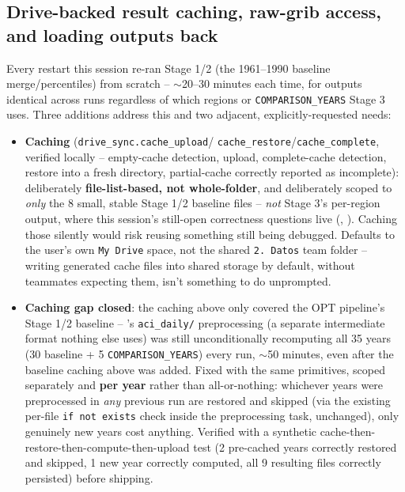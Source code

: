 \documentclass[11pt]{article}
\begin{document}
\subsection{Drive-backed result caching, raw-grib access, and loading
outputs back}

Every restart this session re-ran Stage 1/2 (the 1961--1990 baseline
merge/percentiles) from scratch -- $\sim$20--30 minutes each time, for
outputs identical across runs regardless of which regions or
\texttt{COMPARISON\_YEARS} Stage 3 uses. Three additions address this and
two adjacent, explicitly-requested needs:

\begin{itemize}[leftmargin=*]
\item \textbf{Caching} (\texttt{drive\_sync.cache\_upload}/
  \texttt{cache\_restore}/\texttt{cache\_complete}, verified locally --
  empty-cache detection, upload, complete-cache detection, restore into a
  fresh directory, partial-cache correctly reported as incomplete):
  deliberately \textbf{file-list-based, not whole-folder}, and
  deliberately scoped to \emph{only} the 8 small, stable Stage 1/2
  baseline files -- \emph{not} Stage 3's per-region output, where this
  session's still-open correctness questions live
  (, ). Caching those
  silently would risk reusing something still being debugged. Defaults to
  the user's own \texttt{My Drive} space, not the shared \texttt{2. Datos}
  team folder -- writing generated cache files into shared storage by
  default, without teammates expecting them, isn't something to do
  unprompted.
\item \textbf{Caching gap closed}: the caching above only covered the OPT
  pipeline's Stage 1/2 baseline -- 's
  \texttt{aci\_daily/} preprocessing (a separate intermediate format
  nothing else uses) was still unconditionally recomputing all 35 years
  (30 baseline + 5 \texttt{COMPARISON\_YEARS}) every run, $\sim$50 minutes,
  even after the baseline caching above was added. Fixed with the same
  primitives, scoped separately and \textbf{per year} rather than
  all-or-nothing: whichever years were preprocessed in \emph{any} previous
  run are restored and skipped (via the existing per-file
  \texttt{if not exists} check inside the preprocessing task, unchanged),
  only genuinely new years cost anything. Verified with a synthetic
  cache-then-restore-then-compute-then-upload test (2 pre-cached years
  correctly restored and skipped, 1 new year correctly computed, all 9
  resulting files correctly persisted) before shipping.

\end{itemize}
\end{document}
